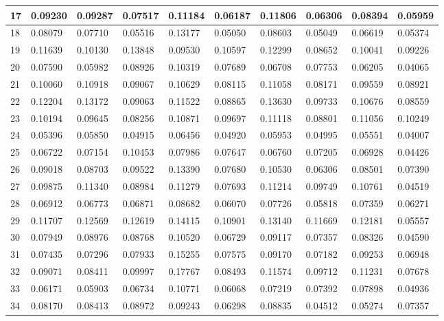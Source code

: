 \begin{table}[H]
{\begin{tabular}{|l|l|l|l|l|l|l|l|l|l|}
        17 & 0.09230 & 0.09287 & 0.07517 & 0.11184 & 0.06187 & 0.11806 & 0.06306 & 0.08394 & 0.05959 \\ \hline
        18 & 0.08079 & 0.07710 & 0.05516 & 0.13177 & 0.05050 & 0.08603 & 0.05049 & 0.06619 & 0.05374 \\ \hline
        19 & 0.11639 & 0.10130 & 0.13848 & 0.09530 & 0.10597 & 0.12299 & 0.08652 & 0.10041 & 0.09226 \\ \hline
        20 & 0.07590 & 0.05982 & 0.08926 & 0.10319 & 0.07689 & 0.06708 & 0.07753 & 0.06205 & 0.04065 \\ \hline
        21 & 0.10060 & 0.10918 & 0.09067 & 0.10629 & 0.08115 & 0.11058 & 0.08171 & 0.09559 & 0.08921 \\ \hline
        22 & 0.12204 & 0.13172 & 0.09063 & 0.11522 & 0.08865 & 0.13630 & 0.09733 & 0.10676 & 0.08559 \\ \hline
        23 & 0.10194 & 0.09645 & 0.08256 & 0.10871 & 0.09697 & 0.11118 & 0.08801 & 0.11056 & 0.10249 \\ \hline
        24 & 0.05396 & 0.05850 & 0.04915 & 0.06456 & 0.04920 & 0.05953 & 0.04995 & 0.05551 & 0.04007 \\ \hline
        25 & 0.06722 & 0.07154 & 0.10453 & 0.07986 & 0.07647 & 0.06760 & 0.07205 & 0.06928 & 0.04426 \\ \hline
        26 & 0.09018 & 0.08703 & 0.09522 & 0.13390 & 0.07680 & 0.10530 & 0.06306 & 0.08501 & 0.07390 \\ \hline
        27 & 0.09875 & 0.11340 & 0.08984 & 0.11279 & 0.07693 & 0.11214 & 0.09749 & 0.10761 & 0.04519 \\ \hline
        28 & 0.06912 & 0.06773 & 0.06871 & 0.08682 & 0.06070 & 0.07726 & 0.05818 & 0.07359 & 0.06271 \\ \hline
        29 & 0.11707 & 0.12569 & 0.12619 & 0.14115 & 0.10901 & 0.13140 & 0.11669 & 0.12181 & 0.05557 \\ \hline
        30 & 0.07949 & 0.08976 & 0.08768 & 0.10520 & 0.06729 & 0.09117 & 0.07357 & 0.08326 & 0.04590 \\ \hline
        31 & 0.07435 & 0.07296 & 0.07933 & 0.15255 & 0.07575 & 0.09170 & 0.07182 & 0.09253 & 0.06948 \\ \hline
        32 & 0.09071 & 0.08411 & 0.09997 & 0.17767 & 0.08493 & 0.11574 & 0.09712 & 0.11231 & 0.07678 \\ \hline
        33 & 0.06171 & 0.05903 & 0.06734 & 0.10771 & 0.06068 & 0.07219 & 0.07392 & 0.07898 & 0.04936 \\ \hline
        34 & 0.08170 & 0.08413 & 0.08972 & 0.09243 & 0.06298 & 0.08835 & 0.04512 & 0.05274 & 0.07357 \\ \hline

\end{tabular}}
\end{table}
